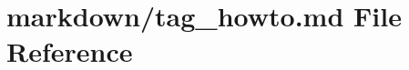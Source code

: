 \hypertarget{tag__howto_8md}{}\section{markdown/tag\+\_\+howto.md File Reference}
\label{tag__howto_8md}
